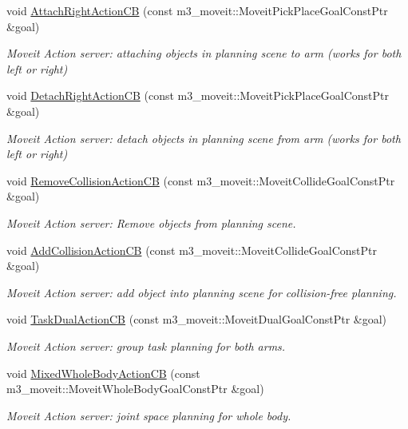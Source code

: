 \begin{DoxyCompactItemize}
void \hyperlink{classM3MoveGroup_abbc7367f21a594bd3ae7a91fe6441480}{Attach\+Right\+Action\+CB} (const m3\+\_\+moveit\+::\+Moveit\+Pick\+Place\+Goal\+Const\+Ptr \&goal)
\begin{DoxyCompactList}\small\item\em Moveit Action server\+: attaching objects in planning scene to arm (works for both left or right) \end{DoxyCompactList}\item 
void \hyperlink{classM3MoveGroup_a0e43c201d45fd9d987dd5b57f57e6402}{Detach\+Right\+Action\+CB} (const m3\+\_\+moveit\+::\+Moveit\+Pick\+Place\+Goal\+Const\+Ptr \&goal)
\begin{DoxyCompactList}\small\item\em Moveit Action server\+: detach objects in planning scene from arm (works for both left or right) \end{DoxyCompactList}\item 
void \hyperlink{classM3MoveGroup_afad468e11f51e093ef704ebe974ecc28}{Remove\+Collision\+Action\+CB} (const m3\+\_\+moveit\+::\+Moveit\+Collide\+Goal\+Const\+Ptr \&goal)
\begin{DoxyCompactList}\small\item\em Moveit Action server\+: Remove objects from planning scene. \end{DoxyCompactList}\item 
void \hyperlink{classM3MoveGroup_aa1aa80c1a53d3829ed0e535f728cbe63}{Add\+Collision\+Action\+CB} (const m3\+\_\+moveit\+::\+Moveit\+Collide\+Goal\+Const\+Ptr \&goal)
\begin{DoxyCompactList}\small\item\em Moveit Action server\+: add object into planning scene for collision-\/free planning. \end{DoxyCompactList}\item 
void \hyperlink{classM3MoveGroup_a4999726d3def40e06217e81fb7f095ab}{Task\+Dual\+Action\+CB} (const m3\+\_\+moveit\+::\+Moveit\+Dual\+Goal\+Const\+Ptr \&goal)
\begin{DoxyCompactList}\small\item\em Moveit Action server\+: group task planning for both arms. \end{DoxyCompactList}\item 
void \hyperlink{classM3MoveGroup_a3cb5511476fb082b891ac3de867ee8b8}{Mixed\+Whole\+Body\+Action\+CB} (const m3\+\_\+moveit\+::\+Moveit\+Whole\+Body\+Goal\+Const\+Ptr \&goal)
\begin{DoxyCompactList}\small\item\em Moveit Action server\+: joint space planning for whole body. \end{DoxyCompactList}\item 

\end{DoxyCompactItemize}
